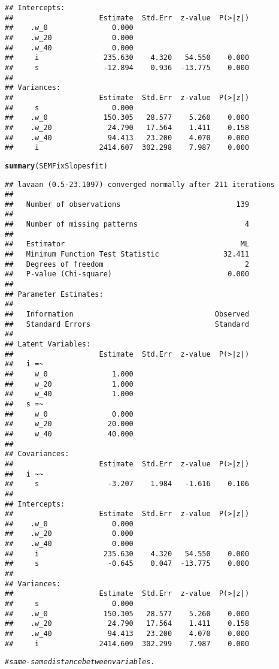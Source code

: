 \documentclass{article}\usepackage[]{graphicx}\usepackage[]{color}
\makeatletter
\newcommand{\hlcom}[1]{\textcolor[rgb]{0.678,0.584,0.686}{\textit{#1}}}%
\newcommand{\hlstd}[1]{\textcolor[rgb]{0.345,0.345,0.345}{#1}}%
\newcommand{\hlkwd}[1]{\textcolor[rgb]{0.737,0.353,0.396}{\textbf{#1}}}%
\newenvironment{kframe}{%
 \def\at@end@of@kframe{}%
 \ifinner\ifhmode%
  \def\at@end@of@kframe{\end{minipage}}%
  \begin{minipage}{\columnwidth}%
 \fi\fi%
 \def\FrameCommand##1{\hskip\@totalleftmargin \hskip-\fboxsep
 \colorbox{shadecolor}{##1}\hskip-\fboxsep
     \hskip-\linewidth \hskip-\@totalleftmargin \hskip\columnwidth}%
 \MakeFramed {\advance\hsize-\width
   \@totalleftmargin\z@ \linewidth\hsize
   \@setminipage}}%
 {\par\unskip\endMakeFramed%
 \at@end@of@kframe}
\newenvironment{knitrout}{}{} %
\makeatother
\begin{document}
\begin{knitrout}
\begin{kframe}
\begin{verbatim}
## Intercepts:
##                    Estimate  Std.Err  z-value  P(>|z|)
##    .w_0               0.000                           
##    .w_20              0.000                           
##    .w_40              0.000                           
##     i               235.630    4.320   54.550    0.000
##     s               -12.894    0.936  -13.775    0.000
## 
## Variances:
##                    Estimate  Std.Err  z-value  P(>|z|)
##     s                 0.000                           
##    .w_0             150.305   28.577    5.260    0.000
##    .w_20             24.790   17.564    1.411    0.158
##    .w_40             94.413   23.200    4.070    0.000
##     i              2414.607  302.298    7.987    0.000
\end{verbatim}
\begin{alltt}
\hlkwd{summary}\hlstd{(SEMFixSlopesfit)}
\end{alltt}
\begin{verbatim}
## lavaan (0.5-23.1097) converged normally after 211 iterations
## 
##   Number of observations                           139
## 
##   Number of missing patterns                         4
## 
##   Estimator                                         ML
##   Minimum Function Test Statistic               32.411
##   Degrees of freedom                                 2
##   P-value (Chi-square)                           0.000
## 
## Parameter Estimates:
## 
##   Information                                 Observed
##   Standard Errors                             Standard
## 
## Latent Variables:
##                    Estimate  Std.Err  z-value  P(>|z|)
##   i =~                                                
##     w_0               1.000                           
##     w_20              1.000                           
##     w_40              1.000                           
##   s =~                                                
##     w_0               0.000                           
##     w_20             20.000                           
##     w_40             40.000                           
## 
## Covariances:
##                    Estimate  Std.Err  z-value  P(>|z|)
##   i ~~                                                
##     s                -3.207    1.984   -1.616    0.106
## 
## Intercepts:
##                    Estimate  Std.Err  z-value  P(>|z|)
##    .w_0               0.000                           
##    .w_20              0.000                           
##    .w_40              0.000                           
##     i               235.630    4.320   54.550    0.000
##     s                -0.645    0.047  -13.775    0.000
## 
## Variances:
##                    Estimate  Std.Err  z-value  P(>|z|)
##     s                 0.000                           
##    .w_0             150.305   28.577    5.260    0.000
##    .w_20             24.790   17.564    1.411    0.158
##    .w_40             94.413   23.200    4.070    0.000
##     i              2414.609  302.299    7.987    0.000
\end{verbatim}
\begin{alltt}
\hlcom{# same - same distance between variables.}


\end{alltt}
\end{kframe}
\end{knitrout}
\end{document}
